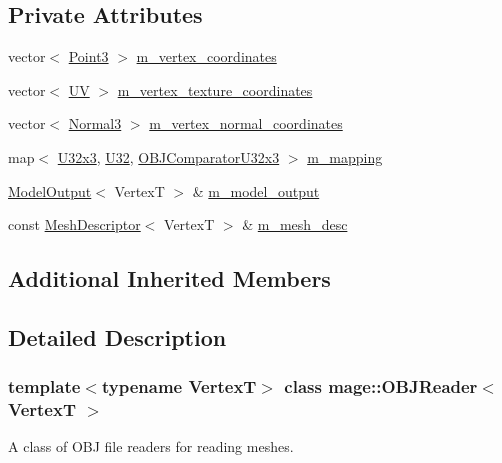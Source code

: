 \subsection*{Private Attributes}
\begin{DoxyCompactItemize}
\item 
vector$<$ \hyperlink{structmage_1_1_point3}{Point3} $>$ \hyperlink{classmage_1_1_o_b_j_reader_a1032eb4a6844a99f1d96fc17c3e52aee}{m\+\_\+vertex\+\_\+coordinates}
\item 
vector$<$ \hyperlink{structmage_1_1_u_v}{UV} $>$ \hyperlink{classmage_1_1_o_b_j_reader_aec7c093d380be0b8506f7b8fdf9c3ad1}{m\+\_\+vertex\+\_\+texture\+\_\+coordinates}
\item 
vector$<$ \hyperlink{structmage_1_1_normal3}{Normal3} $>$ \hyperlink{classmage_1_1_o_b_j_reader_a765e87afe7bd138dadcfc8c194311ed3}{m\+\_\+vertex\+\_\+normal\+\_\+coordinates}
\item 
map$<$ \hyperlink{namespacemage_ab3633c193f686845fcf80ce95d18a20b}{U32x3}, \hyperlink{namespacemage_a41c104c036fba3756a74e19f793eeaa1}{U32}, \hyperlink{structmage_1_1_o_b_j_reader_1_1_o_b_j_comparator_u32x3}{O\+B\+J\+Comparator\+U32x3} $>$ \hyperlink{classmage_1_1_o_b_j_reader_a7e78047c21fac9725df68f1591957c92}{m\+\_\+mapping}
\item 
\hyperlink{structmage_1_1_model_output}{Model\+Output}$<$ VertexT $>$ \& \hyperlink{classmage_1_1_o_b_j_reader_ad4691c59a3e3ecefd201a8f03528bbd8}{m\+\_\+model\+\_\+output}
\item 
const \hyperlink{structmage_1_1_mesh_descriptor}{Mesh\+Descriptor}$<$ VertexT $>$ \& \hyperlink{classmage_1_1_o_b_j_reader_a3395a44a17a5749a332751465cece640}{m\+\_\+mesh\+\_\+desc}
\end{DoxyCompactItemize}
\subsection*{Additional Inherited Members}


\subsection{Detailed Description}
\subsubsection*{template$<$typename VertexT$>$\newline
class mage\+::\+O\+B\+J\+Reader$<$ Vertex\+T $>$}

A class of O\+BJ file readers for reading meshes.


